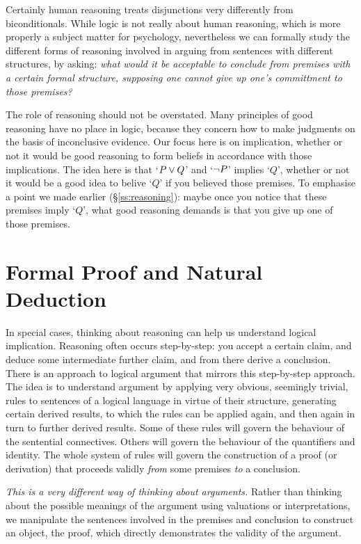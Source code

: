 Certainly human reasoning treats disjunctions very differently from biconditionals. While logic is not really about human reasoning, which is more properly a subject matter for psychology, nevertheless we can formally study the different forms of reasoning involved in arguing from sentences with different structures, by asking: \emph{what would it be acceptable to conclude from premises with a certain formal structure, supposing one cannot give up one's committment to those premises?}

The role of reasoning should not be overstated. Many principles of good reasoning have no place in logic, because they concern how to make judgments on the basis of inconclusive evidence. Our focus here is on implication, whether or not it would be good reasoning to form beliefs in accordance with those implications. The idea here is that `$P \vee Q$' and `$\neg P$' implies `$Q$', whether or not it would be a good idea to belive `$Q$' if you believed those premises. To emphasise a point we made earlier (§\ref{ss:reasoning}): maybe once you notice that these premises imply `$Q$', what good reasoning demands is that you give up one of those premises.

\section{Formal Proof and Natural Deduction}

In special cases, thinking about reasoning can help us understand logical implication. Reasoning often occurs step-by-step: you accept a certain claim, and deduce some intermediate further claim, and from there derive a conclusion. There is an approach to logical argument that mirrors this step-by-step approach. The idea is to understand argument by applying very obvious, seemingly trivial, rules to sentences of a logical language in virtue of their structure, generating certain derived results, to which the rules can be applied again, and then again in turn to further derived results. Some of these rules will govern the behaviour of the sentential connectives. Others will govern the behaviour of the quantifiers and identity. The whole system of rules will govern the construction of a proof (or derivation) that proceeds validly \emph{from} some premises \emph{to} a conclusion.

\emph{This is a very different way of thinking about arguments.} Rather than thinking about the possible meanings of the argument using valuations or interpretations, we manipulate the sentences involved in the premises and conclusion to construct an object, the proof,  which directly demonstrates the validity of the argument. 

